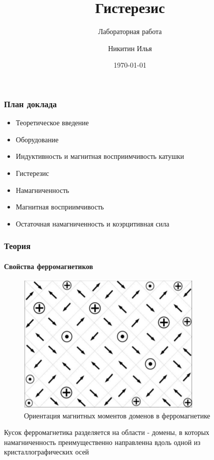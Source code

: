 \documentclass[8pt,pdf,hyperref={unicode}]{beamer}
\title{Гистерезис}
\subtitle{Лабораторная работа}
\author{Никитин Илья}
\date{\today}
\begin{document}
	
	\begin{frame}
		\titlepage
	\end{frame} 
	
	\begin{frame}
		\frametitle{План доклада} 
		\begin{itemize}
			\item Теоретическое введение
			\item Оборудование
			\item Индуктивность и магнитная восприимчивость катушки
			\item Гистерезис
			\item Намагниченность
			\item Магнитная восприимчивость
			\item Остаточная намагниченность и коэрцитивная сила
		\end{itemize}
	\end{frame}
		\begin{frame}
		\frametitle{Теория}
		\framesubtitle{Свойства ферромагнетиков}
		\begin{center}
			\begin{figure}[h!]
				\centering
				\includegraphics[width=.45\linewidth]{Домены1.png}
				\caption{Ориентация магнитных моментов доменов в ферромагнетике}
				\label{fig:3}
			\end{figure}
			Кусок ферромагнетика разделяется на области - домены, в которых намагниченность преимущественно направленна вдоль одной из кристаллографических осей
		\end{center}
	\end{frame}
	
\end{document}
